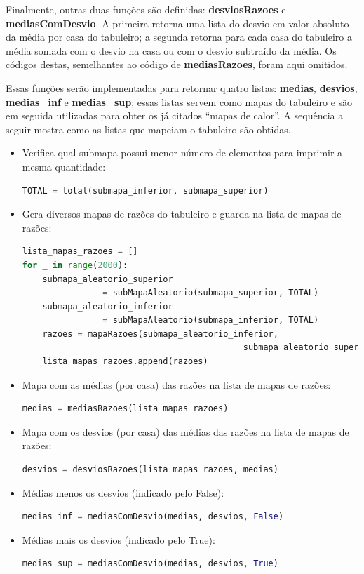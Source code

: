 \documentclass[12pt]{article}
\newcommand{\aspas}[1]{``#1''} %
\begin{document}
Finalmente, outras duas funções são definidas: \textbf{desviosRazoes} e \textbf{mediasComDesvio}. A primeira retorna uma lista do desvio em valor absoluto da média por casa do tabuleiro; a segunda retorna para cada casa do tabuleiro a média somada com o desvio na casa ou com o desvio subtraído da média. Os códigos destas, semelhantes ao código de \textbf{mediasRazoes}, foram aqui omitidos.

Essas funções serão implementadas para retornar quatro listas: \textbf{medias}, \textbf{desvios}, \textbf{medias\_inf} e \textbf{medias\_sup}; essas listas servem como mapas do tabuleiro e são em seguida utilizadas para obter os já citados \aspas{mapas de calor}. A sequência a seguir mostra como as listas que mapeiam o tabuleiro são obtidas.

\begin{itemize}
	\item Verifica qual submapa possui menor número de elementos para imprimir a mesma quantidade:
\begin{lstlisting}[language=Python]
TOTAL = total(submapa_inferior, submapa_superior)
\end{lstlisting}
	
	\item Gera diversos mapas de razões do tabuleiro e guarda na lista de mapas de razões:
\begin{lstlisting}[language=Python]
lista_mapas_razoes = []
for _ in range(2000):
	submapa_aleatorio_superior 
				= subMapaAleatorio(submapa_superior, TOTAL)
	submapa_aleatorio_inferior 
				= subMapaAleatorio(submapa_inferior, TOTAL)
	razoes = mapaRazoes(submapa_aleatorio_inferior, 
											submapa_aleatorio_superior)
	lista_mapas_razoes.append(razoes)
\end{lstlisting}
	
	\item Mapa com as médias (por casa) das razões na lista de mapas de razões:
\begin{lstlisting}[language=Python]
medias = mediasRazoes(lista_mapas_razoes)
\end{lstlisting}
	
	\item Mapa com os desvios (por casa) das médias das razões na lista de mapas de razões:
\begin{lstlisting}[language=Python]
desvios = desviosRazoes(lista_mapas_razoes, medias)
\end{lstlisting}
	
	\item Médias menos os desvios (indicado pelo False):
\begin{lstlisting}[language=Python]
medias_inf = mediasComDesvio(medias, desvios, False)
\end{lstlisting}
	
	\item Médias mais os desvios (indicado pelo True):
\begin{lstlisting}[language=Python]
medias_sup = mediasComDesvio(medias, desvios, True)
\end{lstlisting}
\end{itemize}
\end{document}
